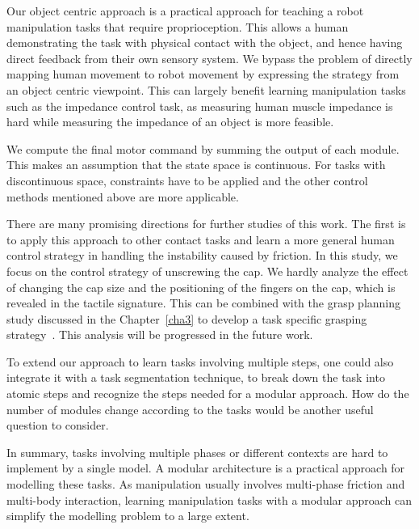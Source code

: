 Our object centric approach is a practical approach for teaching a robot manipulation tasks that require proprioception. This allows a human demonstrating the task with physical contact with the object, and hence having direct feedback from their own sensory system. We bypass the problem of directly mapping human movement to robot movement by expressing the strategy from an object centric viewpoint. This can largely benefit learning manipulation tasks such as the impedance control task, as measuring human muscle impedance is hard while measuring the impedance of an object is more feasible.

We compute the final motor command by summing the output of each module. This makes an assumption that the state space is continuous. For tasks with discontinuous space, constraints have to be applied and the other control methods mentioned above are more applicable.

There are many promising directions for further studies of this work. The first is to apply this approach to other contact tasks and learn a more general human control strategy in handling the instability caused by friction.
In this study, we focus on the control strategy of unscrewing the cap. We hardly analyze the effect of changing the cap size and the positioning of the fingers on the cap, which is revealed in the tactile signature. This can be combined with the grasp planning study discussed in the Chapter~\ref{cha3} to develop a task specific grasping strategy~\citep{el2013generation,dang2014semantic}. This analysis will be progressed in the future work.

To extend our approach to learn tasks involving multiple steps, one could also integrate it with a task segmentation technique, to break down the task into atomic steps and recognize the steps needed for a modular approach. How do the number of modules change according to the tasks would be another useful question to consider.


In summary, tasks involving multiple phases or different contexts are hard to implement by a single model. A modular architecture is a practical approach for modelling these tasks. As manipulation usually involves multi-phase friction and multi-body interaction, learning manipulation tasks with a modular approach can simplify the modelling problem to a large extent.


